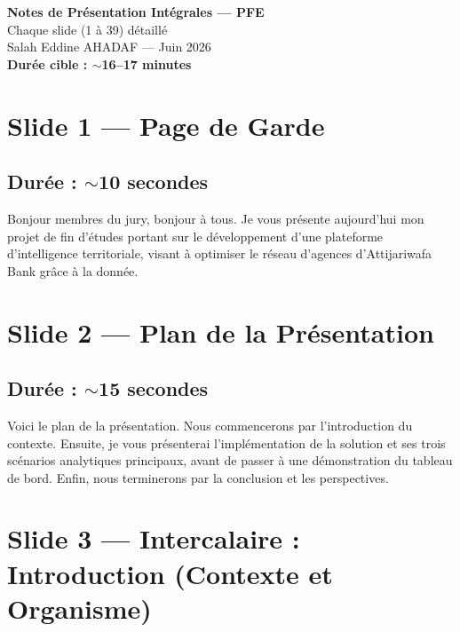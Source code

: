 \documentclass[11pt,a4paper]{article}
\begin{document}
\begin{center}
{\Huge\bfseries\color{accent} Notes de Présentation Intégrales --- PFE}\\[8pt]
{\Large Chaque slide (1 à 39) détaillé}\\[6pt]
{\large Salah Eddine AHADAF --- Juin 2026}\\[6pt]
{\color{timing}\textbf{Durée cible : $\sim$16--17 minutes}}
\end{center}

\vspace{0.5cm}

\section{Slide 1 --- Page de Garde}
\subsection{Durée : $\sim$10 secondes}
Bonjour membres du jury, bonjour à tous. Je vous présente aujourd'hui mon projet de fin d'études portant sur le développement d'une plateforme d'intelligence territoriale, visant à optimiser le réseau d'agences d'Attijariwafa Bank grâce à la donnée.

\section{Slide 2 --- Plan de la Présentation}
\subsection{Durée : $\sim$15 secondes}
Voici le plan de la présentation. Nous commencerons par l'introduction du contexte. Ensuite, je vous présenterai l'implémentation de la solution et ses trois scénarios analytiques principaux, avant de passer à une démonstration du tableau de bord. Enfin, nous terminerons par la conclusion et les perspectives.

\section{Slide 3 --- Intercalaire : Introduction (Contexte et Organisme)}
\end{document}
